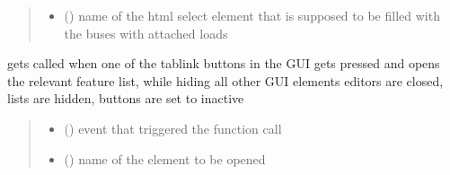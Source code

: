 \documentclass[letterpaper,10pt,english]{sphinxmanual}
\begin{document}
\begin{fulllineitems}
\label{\detokenize{docs_gui/js_api/urbs_results/setup_urbs_results:populateUrbsResultsLoadBusLists}}
\pysigstartsignatures
{}
\pysigstopsignatures\begin{quote}\begin{description}
\begin{itemize}
\item {} 
\sphinxAtStartPar
{} () \textendash{} name of the html select element that is supposed to be filled with the buses with attached loads

\end{itemize}

\end{description}\end{quote}

\end{fulllineitems}


\begin{fulllineitems}
\label{\detokenize{docs_gui/js_api/urbs_results/setup_urbs_results:openUrbsNetworkList}}
\pysigstartsignatures
{}
\pysigstopsignatures
\sphinxAtStartPar
gets called when one of the tablink buttons in the GUI gets pressed and opens the relevant feature list, while hiding all other GUI elements
editors are closed, lists are hidden, buttons are set to inactive
\begin{quote}\begin{description}
\begin{itemize}
\item {} 
\sphinxAtStartPar
{} () \textendash{} event that triggered the function call

\item {} 
\sphinxAtStartPar
{} () \textendash{} name of the element to be opened

\end{itemize}

\end{description}\end{quote}

\end{fulllineitems}
\end{document}

